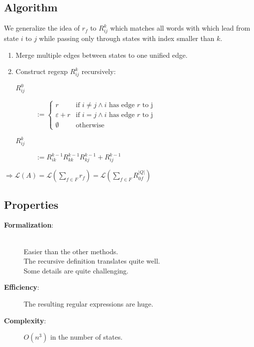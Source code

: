 \documentclass{beamer}
\begin{document}
\subsection*{Algorithm}
\begin{frame}

    We generalize the idea of $r_f$ to $R^k_{i j}$ which matches all words with which lead from state $i$ to $j$ while passing only through states with index smaller than $k$.

    \begin{enumerate}
        \item 
            Merge multiple edges between states to one unified edge.
        \item
            Construct regexp $R^k_{i j}$ recursively:

            \begin{description}

                \item[$R^0_{i j}$]
                    $ := \begin{cases} 
                        r & \mbox{if } i \neq j \wedge i \mbox{ has edge } r \mbox{ to j}  \\
          \varepsilon + r & \mbox{if } i = j \wedge i \mbox{ has edge } r \mbox{ to j}  \\
                \emptyset & \mbox{otherwise}
                    \end{cases}
                    $ 

                \item[$R^k_{i j}$]
                    $ := R^{k-1}_{i k} R^{k-1}_{k k} R^{k-1}_{k j} + R^{k-1}_{i j}$

            \end{description}

    \end{enumerate}

    $\Rightarrow \mathcal{L}(A) = \mathcal{L}(\sum_{f \in F} r_f) = \mathcal{L}(\sum_{f \in F} R^{|Q|}_{0 f})$

\end{frame}

\subsection*{Properties}
\begin{frame}
    \begin{description}
        \item[\textbf{Formalization}:] \hfill \\
            Easier than the other methods.\\
            The recursive definition translates quite well.\\
            Some details are quite challenging.

        \item[\textbf{Efficiency}:] The resulting regular expressions are huge.

        \item[\textbf{Complexity}:]
            $O(n^3)$ in the number of states.
    \end{description}
\end{frame}
\end{document}
